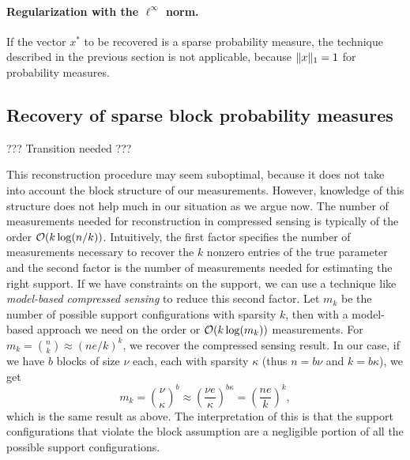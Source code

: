 \documentclass{article} %
\begin{document}
\paragraph{Regularization with the $\ell^\infty$ norm.} If the vector $x^*$ to be recovered is a sparse probability measure, the technique described in the previous section is not applicable, because $\lVert x\rVert_1 = 1$ for probability measures.





\subsection{Recovery of sparse block probability measures}



??? Transition needed ???

This reconstruction procedure may seem suboptimal, because it does not
take into account the block structure of our measurements.
However, knowledge of this structure does not help much in our situation as we
argue now. The number of measurements needed for reconstruction in
compressed sensing is typically of the order
$\mathcal{O}(k\log(n/k))$.
Intuitively, the first factor specifies the number
of measurements necessary to recover the $k$ nonzero entries of the
true parameter and the second factor is the number of measurements
needed for estimating the right support. If we have constraints on the
support, we can use a technique like \emph{model-based compressed
  sensing} \cite{model_sensing} to reduce this second factor.  
Let $m_k$ be the number of possible support configurations with
sparsity $k$, then with a model-based approach we need on the order or
$\mathcal{O}(k\log(m_k))$ measurements.
For $m_k = {n\choose k}\approx (ne/k)^k$, we recover the compressed
sensing result.
In our case, if we have $b$ blocks of size $\nu$ each, each with
sparsity $\kappa$ (thus $n = b\nu$ and $k=b\kappa$), we get
\begin{equation*}
m_k = {\nu \choose \kappa}^b \approx \left(\frac{\nu
  e}{\kappa}\right)^{b\kappa} = \left(\frac{ne}{k}\right)^k,
\end{equation*}
which is the same result as above. The interpretation of this is that
the support configurations that violate the block assumption are a
negligible portion of all the possible support configurations.
\end{document}
